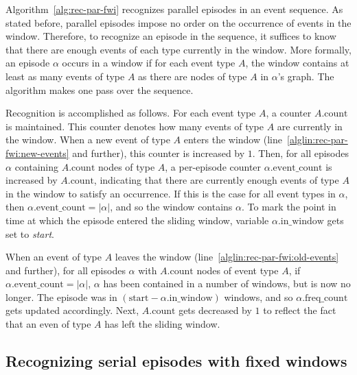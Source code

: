 \begin{algorithm}
\begin{algorithmic}[1]
\end{algorithmic}

\label{alg:rec-par-fwi}
\end{algorithm}

Algorithm~\ref{alg:rec-par-fwi} recognizes parallel episodes in an event sequence. As stated before, parallel episodes impose no order on the occurrence of events in the window. Therefore, to recognize an episode in the sequence, it suffices to know that there are enough events of each type currently in the window. More formally, an episode $ \alpha $ occurs in a window if for each event type $ A $, the window contains at least as many events of type $ A $ as there are nodes of type $ A $ in $ \alpha $'s graph. The algorithm makes one pass over the sequence.

Recognition is accomplished as follows. For each event type $ A $, a counter $ A \text{.count} $ is maintained. This counter denotes how many events of type $ A $ are currently in the window. When a new event of type $ A $ enters the window (line~\ref{alglin:rec-par-fwi:new-events} and further), this counter is increased by $ 1 $. Then, for all episodes $ \alpha $ containing $ A \text{.count} $ nodes of type $ A $, a per-episode counter $ \alpha \text{.event\_count} $ is increased by $ A \text{.count} $, indicating that there are currently enough events of type $ A $ in the window to satisfy an occurrence. If this is the case for all event types in $ \alpha $, then $ \alpha \text{.event\_count} = | \alpha | $, and so the window contains $ \alpha $. To mark the point in time at which the episode entered the sliding window, variable $ \alpha \text{.in\_window} $ gets set to \emph{start}.

When an event of type $ A $ leaves the window (line~\ref{alglin:rec-par-fwi:old-events} and further), for all episodes $ \alpha $ with $ A \text{.count} $ nodes of event type $ A $, if $ \alpha \text{.event\_count} = | \alpha | $, $ \alpha $ has been contained in a number of windows, but is now no longer. The episode was in $ (\text{start} - \alpha \text{.in\_window}) $ windows, and so $ \alpha \text{.freq\_count} $ gets updated accordingly. Next, $ A \text{.count} $ gets decreased by $ 1 $ to reflect the fact that an even of type $ A $ has left the sliding window.

\subsection{Recognizing serial episodes with fixed windows}

